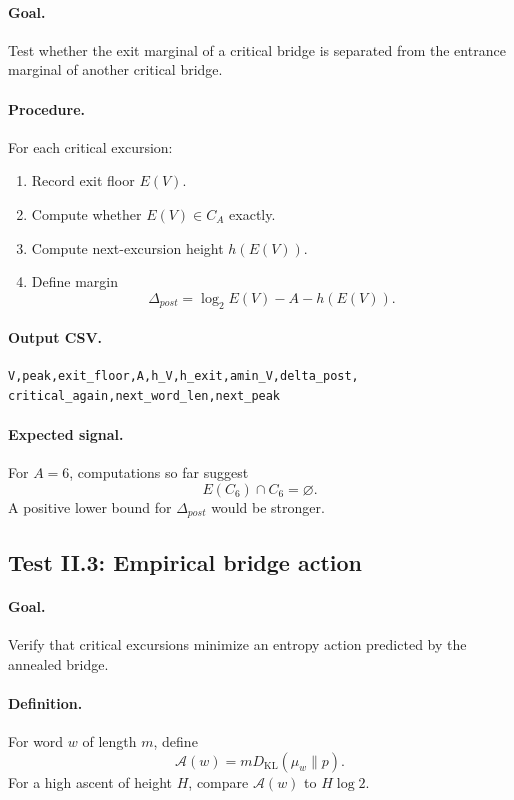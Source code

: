 \documentclass[11pt]{article}
\newcommand{\KL}{D_{\mathrm{KL}}}
\begin{document}
\paragraph{Goal.} Test whether the exit marginal of a critical bridge is separated from the entrance marginal of another critical bridge.

\paragraph{Procedure.}
For each critical excursion:
\begin{enumerate}
  \item Record exit floor $E(V)$.
  \item Compute whether $E(V)\in C_A$ exactly.
  \item Compute next-excursion height $h(E(V))$.
  \item Define margin
  \[
    \Delta_{post}=\log_2E(V)-A-h(E(V)).
  \]
\end{enumerate}

\paragraph{Output CSV.}
\begin{verbatim}
V,peak,exit_floor,A,h_V,h_exit,amin_V,delta_post,
critical_again,next_word_len,next_peak
\end{verbatim}

\paragraph{Expected signal.}
For $A=6$, computations so far suggest
\[
  E(C_6)\cap C_6=\varnothing.
\]
A positive lower bound for $\Delta_{post}$ would be stronger.

\subsection{Test II.3: Empirical bridge action}

\paragraph{Goal.} Verify that critical excursions minimize an entropy action predicted by the annealed bridge.

\paragraph{Definition.}
For word $w$ of length $m$, define
\[
  \mathcal A(w)=m\KL(\mu_w\|p).
\]
For a high ascent of height $H$, compare $\mathcal A(w)$ to $H\log 2$.
\end{document}
